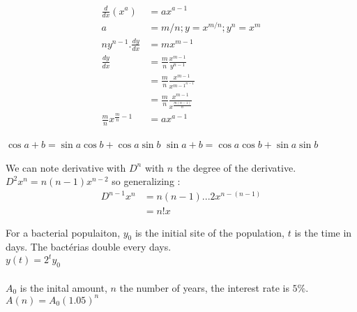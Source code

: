 \documentclass{article}
\begin{document}
                    \begin{align*}
                        \frac{d}{dx} (x^a) &= ax^{a-1}\\
                        a &= m/n ; y = x^{m/n} ; y^n = x^m\\
                        ny^{n-1}.\frac{dy}{dx} &= mx^{m-1}\\
                        \frac{dy}{dx} &= \frac{m}{n} \frac{x^{m-1}}{y^{n-1}}\\
                         &= \frac{m}{n} \frac{x^{m-1}}{x^{{m-1}^{n-1}}}\\
                         &= \frac{m}{n} \frac{x^{m-1}}{x^{\frac{m(n-1)}{n}}}\\
                         \frac{m}{n}x^{\frac{m}{n} -1} &= ax^{a-1}
                    \end{align*}

                    \begin{center}
                        $\cos a + b = \sin a \cos b + \cos a \sin b$
                        $\sin a+b = \cos a \cos b + \sin a \sin b$
                    \end{center}

                    We can note derivative with $D^n$ with $n$ the degree of the derivative.\\
                    $D^2 x^n = n(n-1)x^{n-2}$ so generalizing :
                    \begin{align*}
                        D^{n-1} x^n &= n(n-1)...2 x^{n-(n-1)}\\
                        &= n! x
                    \end{align*}

                    For a bacterial populaiton, $y_0$ is the initial site of the population, $t$ is the time in days. The bactérias double every days.\\
                    $y(t) = 2^t y_0$\\~\\

                    $A_0$ is the inital amount, $n$ the number of years, the interest rate is $5\%$.\\
                    $A(n) = A_0 (1.05)^n$\\
\end{document}
